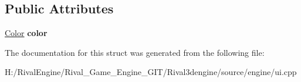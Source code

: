 \subsection*{Public Attributes}
\begin{DoxyCompactItemize}
\item 
\mbox{\label{struct_u_i_1_1_outline_a901ec319b96b4d7f34cc59f0584ad305}} 
\hyperlink{struct_u_i_1_1_color}{Color} {\bfseries color}
\end{DoxyCompactItemize}


The documentation for this struct was generated from the following file\+:\begin{DoxyCompactItemize}
\item 
H\+:/\+Rival\+Engine/\+Rival\+\_\+\+Game\+\_\+\+Engine\+\_\+\+G\+I\+T/\+Rival3dengine/source/engine/ui.\+cpp\end{DoxyCompactItemize}
